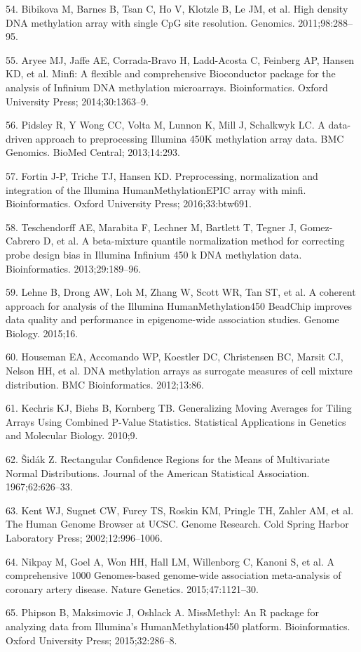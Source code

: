 \documentclass[]{bmcart}
\begin{document}
54. Bibikova M, Barnes B, Tsan C, Ho V, Klotzle B, Le JM, et al. High
density DNA methylation array with single CpG site resolution. Genomics.
2011;98:288--95.

55. Aryee MJ, Jaffe AE, Corrada-Bravo H, Ladd-Acosta C, Feinberg AP,
Hansen KD, et al. Minfi: A flexible and comprehensive Bioconductor
package for the analysis of Infinium DNA methylation microarrays.
Bioinformatics. Oxford University Press; 2014;30:1363--9.

56. Pidsley R, {Y Wong} CC, Volta M, Lunnon K, Mill J, Schalkwyk LC. A
data-driven approach to preprocessing Illumina 450K methylation array
data. BMC Genomics. BioMed Central; 2013;14:293.

57. Fortin J-P, Triche TJ, Hansen KD. Preprocessing, normalization and
integration of the Illumina HumanMethylationEPIC array with minfi.
Bioinformatics. Oxford University Press; 2016;33:btw691.

58. Teschendorff AE, Marabita F, Lechner M, Bartlett T, Tegner J,
Gomez-Cabrero D, et al. A beta-mixture quantile normalization method for
correcting probe design bias in Illumina Infinium 450 k DNA methylation
data. Bioinformatics. 2013;29:189--96.

59. Lehne B, Drong AW, Loh M, Zhang W, Scott WR, Tan ST, et al. A
coherent approach for analysis of the Illumina HumanMethylation450
BeadChip improves data quality and performance in epigenome-wide
association studies. Genome Biology. 2015;16.

60. Houseman EA, Accomando WP, Koestler DC, Christensen BC, Marsit CJ,
Nelson HH, et al. DNA methylation arrays as surrogate measures of cell
mixture distribution. BMC Bioinformatics. 2012;13:86.

61. Kechris KJ, Biehs B, Kornberg TB. Generalizing Moving Averages for
Tiling Arrays Using Combined P-Value Statistics. Statistical
Applications in Genetics and Molecular Biology. 2010;9.

62. {Š}id{á}k Z. Rectangular Confidence Regions for the Means of
Multivariate Normal Distributions. Journal of the American Statistical
Association. 1967;62:626--33.

63. Kent WJ, Sugnet CW, Furey TS, Roskin KM, Pringle TH, Zahler AM, et
al. The Human Genome Browser at UCSC. Genome Research. Cold Spring
Harbor Laboratory Press; 2002;12:996--1006.

64. Nikpay M, Goel A, Won HH, Hall LM, Willenborg C, Kanoni S, et al. A
comprehensive 1000 Genomes-based genome-wide association meta-analysis
of coronary artery disease. Nature Genetics. 2015;47:1121--30.

65. Phipson B, Maksimovic J, Oshlack A. MissMethyl: An R package for
analyzing data from Illumina's HumanMethylation450 platform.
Bioinformatics. Oxford University Press; 2015;32:286--8.
\end{document}
